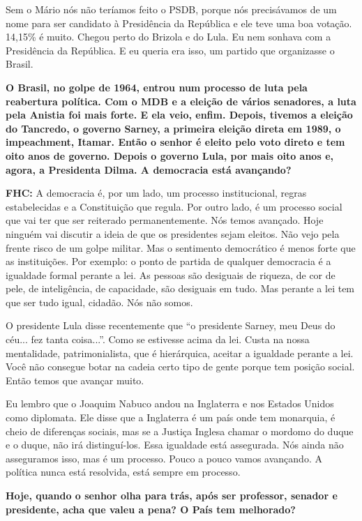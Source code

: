 Sem o Mário nós não teríamos feito o PSDB, porque nós precisávamos de um
nome para ser candidato à Presidência da República e ele teve uma boa
votação. 14,15\% é muito. Chegou perto do Brizola e do Lula. Eu nem
sonhava com a Presidência da República. E eu queria era isso, um partido
que organizasse o Brasil.

\textbf{O Brasil, no golpe de 1964, entrou num processo de luta pela
reabertura política. Com o MDB e a eleição de vários senadores, a luta
pela Anistia foi mais forte. E ela veio, enfim. Depois, tivemos a
eleição do Tancredo, o governo Sarney, a primeira eleição direta em
1989, o impeachment, Itamar. Então o senhor é eleito pelo voto direto e
tem oito anos de governo. Depois o governo Lula, por mais oito anos e,
agora, a Presidenta Dilma. A democracia está avançando?}

\textbf{FHC:} A democracia é, por um lado, um processo institucional,
regras estabelecidas e a Constituição que regula. Por outro lado, é um
processo social que vai ter que ser reiterado permanentemente. Nós temos
avançado. Hoje ninguém vai discutir a ideia de que os presidentes sejam
eleitos. Não vejo pela frente risco de um golpe militar. Mas o
sentimento democrático é menos forte que as instituições. Por exemplo: o
ponto de partida de qualquer democracia é a igualdade formal perante a
lei. As pessoas são desiguais de riqueza, de cor de pele, de
inteligência, de capacidade, são desiguais em tudo. Mas perante a lei
tem que ser tudo igual, cidadão. Nós não somos.

O presidente Lula disse recentemente que ``o presidente Sarney, meu Deus
do céu... fez tanta coisa...''. Como se estivesse acima da lei. Custa na
nossa mentalidade, patrimonialista, que é hierárquica, aceitar a
igualdade perante a lei. Você não consegue botar na cadeia certo tipo de
gente porque tem posição social. Então temos que avançar muito.

Eu lembro que o Joaquim Nabuco andou na Inglaterra e nos Estados Unidos
como diplomata. Ele disse que a Inglaterra é um país onde tem monarquia,
é cheio de diferenças sociais, mas se a Justiça Inglesa chamar o mordomo
do duque e o duque, não irá distinguí-los. Essa igualdade está
assegurada. Nós ainda não asseguramos isso, mas é um processo. Pouco a
pouco vamos avançando. A política nunca está resolvida, está sempre em
processo.

\textbf{Hoje, quando o senhor olha para trás, após ser professor,
senador e presidente, acha que valeu a pena? O País tem melhorado?}

